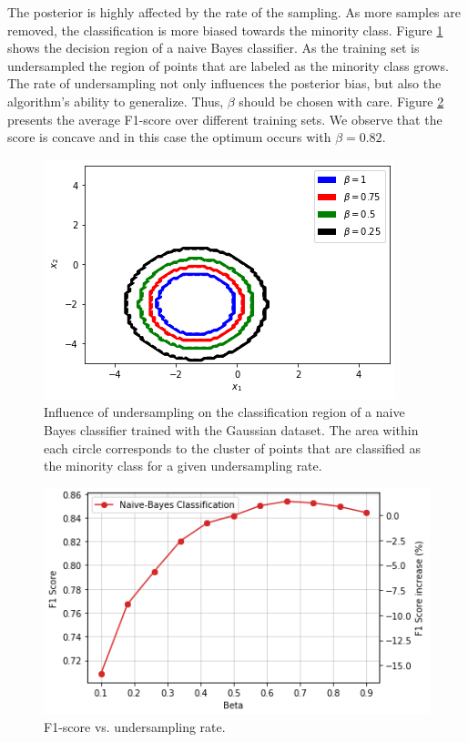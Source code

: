 \documentclass[conference]{IEEEtran}
\begin{document}
		The posterior is highly affected by the rate of the sampling. As more samples are removed, the classification is more biased towards the minority class. Figure \ref{fig:Undersampling_2D_Contour_Classification} shows the decision region of a naive Bayes classifier. As the training set is undersampled the region of points that are labeled as the minority class grows. The rate of undersampling not only influences the posterior bias, but also the algorithm's ability to generalize. Thus, $\beta$ should be chosen with care. Figure \ref{fig:Undersampling_F1_Score} presents the average F1-score over different training sets. We observe that the score is concave and in this case the optimum occurs with $\beta=0.82$.

			\begin{figure}[h]
				\includegraphics[scale=0.45]{Undersampling_2D_Contour_Classification}
				\centering
				\caption{Influence of undersampling on the classification region of a naive Bayes classifier trained with the Gaussian dataset. The area within each circle corresponds to the cluster of points that are classified as the minority class for a given undersampling rate.}
				\label{fig:Undersampling_2D_Contour_Classification}
			\end{figure}
		
			\begin{figure}[h]
				\includegraphics[scale=0.45]{Undersampling_F1_Score}
				\centering
				\caption{F1-score vs. undersampling rate.}
				\label{fig:Undersampling_F1_Score}
			\end{figure}
		
\end{document}
